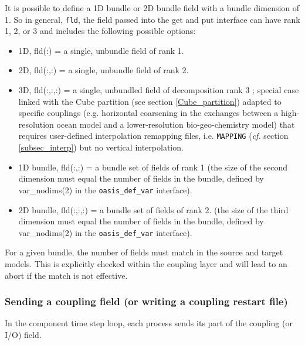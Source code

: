 It is possible to define a 1D bundle or 2D bundle field  with a bundle dimension of 1.
So in general, {\tt fld}, the field passed into the get and put interface can have rank
1, 2, or 3 and includes the following possible options:

\begin{itemize}
\item 1D, fld(:) = a single, unbundle field of rank 1.
\item 2D, fld(:,:) = a single, unbundle field of rank 2.
\item 3D, fld(:,:,:) = a single, unbundled field of decomposition rank 3 ; 
special case linked with the Cube partition (see section \ref{Cube_partition}) adapted to specific
couplings (e.g. horizontal coarsening in the exchanges between a high-resolution
ocean model and a lower-resolution bio-geo-chemistry model)
that requires user-defined interpolation remapping files, 
i.e. {\tt MAPPING} ({\em cf.} section \ref{subsec_interp}) but no vertical interpolation.
\item 1D bundle, fld(:,:) = a bundle set of fields of rank 1
 (the size of the second dimension must equal the number of fields in the
  bundle, defined by var\_nodims(2) in the {\tt oasis\_def\_var} interface).
\item 2D bundle, fld(:,:,:) = a bundle set of fields of rank 2.
  (the size of the third dimension must equal the number of fields in the
  bundle, defined by var\_nodims(2) in the {\tt oasis\_def\_var} interface).
\end{itemize}

For a given bundle, the
number of fields must match in the source and target models.  This is explicitly
checked within the coupling layer and will lead to an abort if the match is not effective. 

\subsubsection{Sending a coupling field (or writing a coupling restart file)}
\label{prismput}

In the component time step loop, each process sends its part of the
coupling (or I/O) field.

